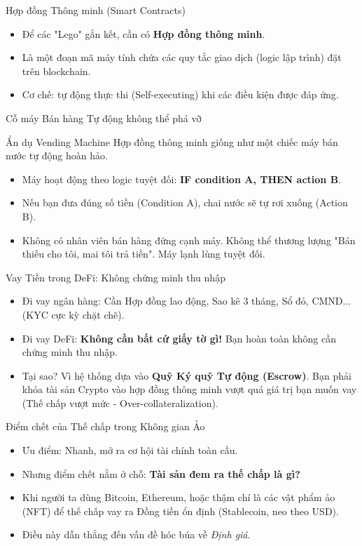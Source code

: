 \documentclass[aspectratio=169, 12pt]{beamer}
\begin{document}
\begin{frame}{Hợp đồng Thông minh (Smart Contracts)}
    \begin{itemize}
        \item Để các "Lego" gắn kết, cần có \textbf{Hợp đồng thông minh}.
        \item Là một đoạn mã máy tính chứa các quy tắc giao dịch (logic lập trình) đặt trên blockchain.
        \item Cơ chế: tự động thực thi (Self-executing) khi các điều kiện được đáp ứng.
    \end{itemize}
\end{frame}

\begin{frame}{Cỗ máy Bán hàng Tự động không thể phá vỡ}
    \begin{block}{Ẩn dụ Vending Machine}
        Hợp đồng thông minh giống như một chiếc máy bán nước tự động hoàn hảo.
    \end{block}
    \begin{itemize}
        \item Máy hoạt động theo logic tuyệt đối: \textbf{IF condition A, THEN action B}.
        \item Nếu bạn đưa đúng số tiền (Condition A), chai nước sẽ tự rơi xuống (Action B).
        \item Không có nhân viên bán hàng đứng cạnh máy. Không thể thương lượng "Bán thiếu cho tôi, mai tôi trả tiền". Máy lạnh lùng tuyệt đối.
    \end{itemize}
\end{frame}

\begin{frame}{Vay Tiền trong DeFi: Không chứng minh thu nhập}
    \begin{itemize}
        \item Đi vay ngân hàng: Cần Hợp đồng lao động, Sao kê 3 tháng, Sổ đỏ, CMND... (KYC cực kỳ chặt chẽ).
        \item Đi vay DeFi: \textbf{Không cần bất cứ giấy tờ gì!} Bạn hoàn toàn không cần chứng minh thu nhập.
        \item Tại sao? Vì hệ thống dựa vào \textbf{Quỹ Ký quỹ Tự động (Escrow)}. Bạn phải khóa tài sản Crypto vào hợp đồng thông minh vượt quá giá trị bạn muốn vay (Thế chấp vượt mức - Over-collateralization).
    \end{itemize}
\end{frame}

\begin{frame}{Điểm chết của Thế chấp trong Không gian Ảo}
    \begin{itemize}
        \item Ưu điểm: Nhanh, mở ra cơ hội tài chính toàn cầu.
        \item Nhưng điểm chết nằm ở chỗ: \textbf{Tài sản đem ra thế chấp là gì?}
        \item Khi người ta dùng Bitcoin, Ethereum, hoặc thậm chí là các vật phẩm ảo (NFT) để thế chấp vay ra Đồng tiền ổn định (Stablecoin, neo theo USD).
        \item Điều này dẫn thẳng đến vấn đề hóc búa về \textit{Định giá}.
    \end{itemize}
\end{frame}
\end{document}
